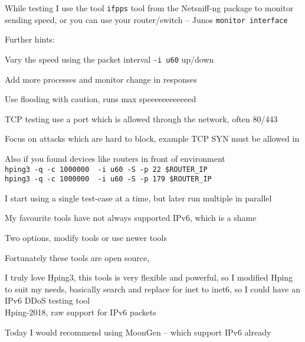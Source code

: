 \documentclass[Screen16to9,17pt]{foils}
\begin{document}
While testing I use the tool \verb+ifpps+ tool from the Netsniff-ng package  to monitor sending speed, or you can use your router/switch -- Junos \verb+monitor interface+



Further hints:
\begin{list2}
\item Vary the speed using the packet interval \verb+-i u60+ up/down
\item Add more processes and monitor change in responses
\item Use flooding with caution, runs max speeeeeeeeeeeed \smiley
\item TCP testing use a port which is allowed through the network, often 80/443
\item Focus on attacks which are hard to block, example TCP SYN must be allowed in
\item Also if you found devices like routers in front of environment\\
\verb+hping3 -q -c 1000000  -i u60 -S -p 22 $ROUTER_IP+\\
\verb+hping3 -q -c 1000000  -i u60 -S -p 179 $ROUTER_IP+
\end{list2}

I start using a single test-case at a time, but later run multiple in parallel


My favourite tools have not always supported IPv6, which is a shame

Two options, modify tools or use newer tools

\begin{list2}
\item Fortunately these tools are open source,

\item I truly love Hping3, this tools is very flexible and powerful, so I modified Hping to suit my needs, basically search and replace for inet to inet6, so I could have an IPv6 DDoS testing tool\\
 Hping-2018, raw support for IPv6 packets
\item Today I would recommend using MoonGen -- which support IPv6 already\\
\end{list2}


\end{document}
